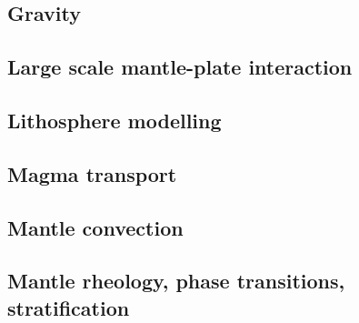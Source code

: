\cite{asbl06}
\cite{zhjg11}
\cite{issg15}

\subsection*{Gravity}

\cite{zhou08}

\subsection*{Large scale mantle-plate interaction}

\cite{algs12}

\subsection*{Lithosphere modelling}

\cite{nefo93}
\cite{hanl00}
\cite{homo01}
\cite{hagu05}
\cite{afrf07}
\cite{affr08}
\cite{hapo08}
\cite{hamo10}

\subsection*{Magma transport}

\cite{yatd12}

\subsection*{Mantle convection}

\cite{hemw75}
\cite{olco80}\cite{jamc80}
\cite{jape82}\cite{homc82}
\cite{hous83}\cite{hous83b}
\cite{olyb84}\cite{jarv84}\cite{haeb84}\cite{harp84}
\cite{jarv85}
\cite{yuqh87}
\cite{zhch93}\cite{jarv93}
\cite{haeb94}
\cite{zhgu95}
\cite{zhyu96}\cite{hond96}
\cite{hond97}\cite{iwho97}
\cite{ande98}\cite{iwho98}
\cite{albe00}\cite{hayu00}
\cite{zhzm00}
\cite{hapa03}
\cite{nake07}
\cite{holj13}
\cite{arfw14}\cite{helo14}

\subsection*{Mantle rheology, phase transitions, stratification}

